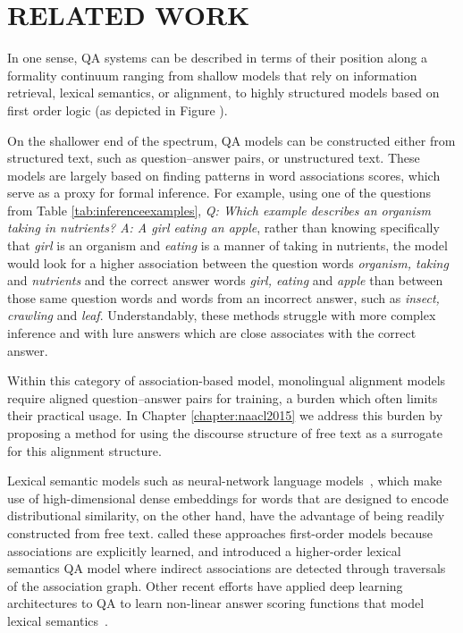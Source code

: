 \chapter{RELATED WORK\label{chapter:related_work}}

In one sense, QA systems can be described in terms of their position along a formality continuum ranging from shallow models that rely on information retrieval, lexical semantics, or alignment, to highly structured models based on first order logic (as depicted in Figure ).

On the shallower end of the spectrum,  QA models can be constructed either from structured text, such as question--answer pairs, or unstructured text.  These models are largely based on finding patterns in word associations scores, which serve as a proxy for formal inference.  For example, using one of the questions from Table \ref{tab:inferenceexamples}, \emph{Q: Which example describes an organism taking in nutrients? A: A girl eating an apple}, rather than knowing specifically that \emph{girl} is an organism and \emph{eating} is a manner of taking in nutrients, the model would look for a higher association between the question words \emph{organism, taking} and \emph{nutrients} and the correct answer words \emph{girl, eating} and \emph{apple} than between those same question words and words from an incorrect answer, such as \emph{insect, crawling} and \emph{leaf}.  Understandably, these methods struggle with more complex inference and with lure answers which are close associates with the correct answer. 

Within this category of association-based model, monolingual alignment models~\citep{Berger:00,echihabi2003noisy,Soricut:06,Riezler:etal:2007,Surdeanu:11,yao2013}  require aligned question--answer pairs for training, a burden which often limits their practical usage.  In Chapter \ref{chapter:naacl2015} we address this burden by proposing a method for using the discourse structure of free text as a surrogate for this alignment structure. %

Lexical semantic models such as neural-network language models~\citep{jansen14,sultan-etal:2014:TACL,yih13}, which make use of high-dimensional dense embeddings for words that are designed to encode distributional similarity, on the other hand, have the advantage of being readily constructed from free text.  
\citet{fried2015higher} called these approaches first-order models because associations are explicitly learned, and introduced a higher-order lexical semantics QA model where indirect associations are detected through traversals of the association graph.  
Other recent efforts have applied deep learning architectures to QA to learn non-linear answer scoring functions that model lexical semantics~\citep{Iyyer2014,nips15_hermann}.

